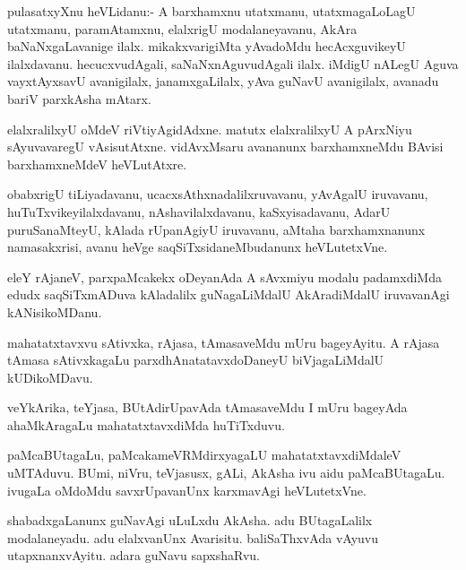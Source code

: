 \documentclass{article}
\begin{document}
\begin{mn}%
pulasatxyXnu heVLidanu:- A barxhamxnu utatxmanu, utatxmagaLoLagU
utatxmanu, paramAtamxnu, elalxrigU modalaneyavanu, AkAra
baNaNxgaLavanige ilalx. mikakxvarigiMta yAvadoMdu hecAcxguvikeyU
ilalxdavanu. hecucxvudAgali, saNaNxnAguvudAgali ilalx. iMdigU nALegU
Aguva vayxtAyxsavU avanigilalx, janamxgaLilalx, yAva guNavU
avanigilalx, avanadu bariV parxkAsha mAtarx.
\end{mn}

\begin{mn}
elalxralilxyU oMdeV riVtiyAgidAdxne. matutx elalxralilxyU A pArxNiyu
sAyuvavaregU vAsisutAtxne. vidAvxMsaru avananunx barxhamxneMdu BAvisi
barxhamxneMdeV heVLutAtxre.
\end{mn}

\begin{mn}
obabxrigU tiLiyadavanu, ucacxsAthxnadalilxruvavanu, yAvAgalU
iruvavanu, huTuTxvikeyilalxdavanu, nAshavilalxdavanu, kaSxyisadavanu,
AdarU puruSanaMteyU, kAlada rUpanAgiyU iruvavanu, aMtaha
barxhamxnanunx namasakxrisi, avanu heVge saqSiTxsidaneMbudanunx heVLutetxVne.
\end{mn}

\begin{mn}%
eleY rAjaneV, parxpaMcakekx oDeyanAda A sAvxmiyu modalu padamxdiMda
edudx saqSiTxmADuva kAladalilx guNagaLiMdalU AkAradiMdalU iruvavanAgi kANisikoMDanu.
\end{mn}

\begin{mn}
mahatatxtavxvu sAtivxka, rAjasa, tAmasaveMdu mUru bageyAyitu. A rAjasa
tAmasa sAtivxkagaLu parxdhAnatatavxdoDaneyU biVjagaLiMdalU kUDikoMDavu.
\end{mn}

\begin{mn}
veYkArika, teYjasa, BUtAdirUpavAda tAmasaveMdu I mUru bageyAda
ahaMkAragaLu mahatatxtavxdiMda huTiTxduvu.
\end{mn}

\begin{mn}%
paMcaBUtagaLu, paMcakameVRMdirxyagaLU mahatatxtavxdiMdaleV
uMTAduvu. BUmi, niVru, teVjasusx, gALi, AkAsha ivu aidu
paMcaBUtagaLu. ivugaLa oMdoMdu savxrUpavanUnx karxmavAgi heVLutetxVne.
\end{mn}

\begin{mn}
shabadxgaLanunx guNavAgi uLuLxdu AkAsha. adu BUtagaLalilx
modalaneyadu. adu elalxvanUnx Avarisitu. baliSaThxvAda vAyuvu
utapxnanxvAyitu. adara guNavu sapxshaRvu.
\end{mn}
\end{document}
